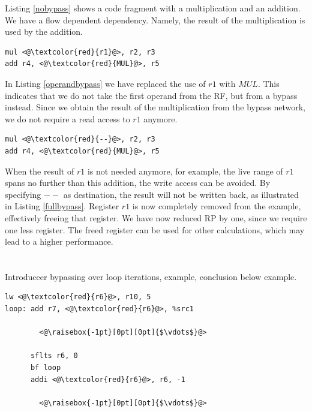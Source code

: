 Listing \ref{nobypass} shows a code fragment with a multiplication and an addition. We have a flow dependent dependency. Namely, the result of the multiplication is used by the addition.

\begin{lstlisting}[caption=Example code fragment avoiding a read access., label=operandbypass]
mul <@\textcolor{red}{r1}@>, r2, r3
add r4, <@\textcolor{red}{MUL}@>, r5
\end{lstlisting}

In Listing \ref{operandbypass} we have replaced the use of $r1$ with $MUL$. This indicates that we do not take the first operand from the RF, but from a bypass instead. Since we obtain the result of the multiplication from the bypass network, we do not require a read access to $r1$ anymore.

\begin{lstlisting}[caption=Example code fragment avoiding a read and a write access., label=fullbypass]
mul <@\textcolor{red}{--}@>, r2, r3
add r4, <@\textcolor{red}{MUL}@>, r5
\end{lstlisting}

When the result of $r1$ is not needed anymore, for example, the live range of $r1$ spans no further than this addition, the write access can be avoided. By specifying $--$ as destination, the result will not be written back, as illustrated in Listing \ref{fullbypass}. Register $r1$ is now completely removed from the example, effectively freeing that register. We have now reduced RP by one, since we require one less register. The freed register can be used for other calculations, which may lead to a higher performance.


\section{}





Introduceer bypassing over loop iterations, example, conclusion below example. 

\begin{lstlisting}[caption=Example code fragment bypassing through loop iteration., label=bypassloop]
      lw <@\textcolor{red}{r6}@>, r10, 5
loop: add r7, <@\textcolor{red}{r6}@>, %src1

        <@\raisebox{-1pt}[0pt][0pt]{$\vdots$}@>
      
      sflts r6, 0
      bf loop
      addi <@\textcolor{red}{r6}@>, r6, -1

        <@\raisebox{-1pt}[0pt][0pt]{$\vdots$}@>
\end{lstlisting}

